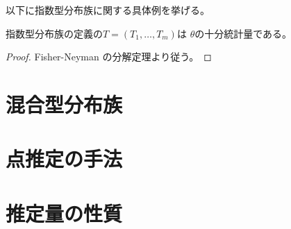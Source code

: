 \documentclass[report]{jlreq}
\begin{document}
以下に指数型分布族に関する具体例を挙げる。

\begin{example}[正規分布]
    \TODO{}
\end{example}

\begin{proposition}
    指数型分布族の定義の$T = (T_1, \dots, T_m)$は
    $\theta$の十分統計量である。
\end{proposition}

\begin{proof}
    Fisher-Neyman の分解定理より従う。
\end{proof}

%
\section{混合型分布族}

\begin{definition}[混合型分布族]
    \TODO{}
\end{definition}

%
\section{点推定の手法}

\begin{definition}[最尤推定]
    \TODO{}
\end{definition}

\begin{definition}[モーメント法]
    \TODO{}
\end{definition}

\begin{definition}[最小2乗法]
    \TODO{}
\end{definition}

%
\section{推定量の性質}

\begin{definition}[不偏性]
    \TODO{}
\end{definition}
\end{document}
